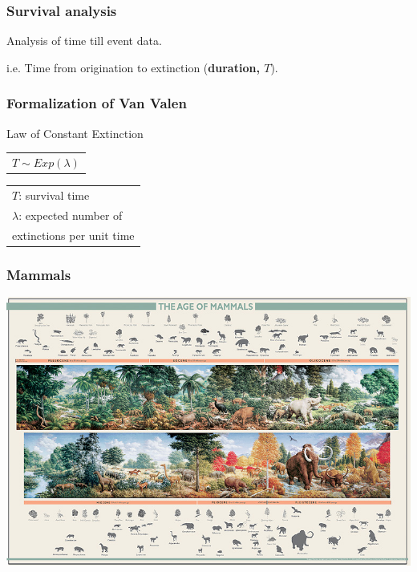 \documentclass{beamer}
\begin{document}
\begin{frame}
  \frametitle{Survival analysis}

  \begin{definition}
    Analysis of \alert{time till event data}.

    i.e. Time from origination to extinction (\textbf{duration, \(T\)}).
  \end{definition}

\end{frame}

\begin{frame}
  \frametitle{Formalization of Van Valen}

  \begin{block}{Law of Constant Extinction}
    \begin{center}
      \begin{tabular}{@{}l@{}}\(T \sim Exp(\lambda)\)\end{tabular}
      \hspace{1.5cm}
      \begin{tabular}{@{}l@{}}\(T\): survival time\\\(\lambda\): expected number of \\extinctions per unit time\end{tabular}
    \end{center}
  \end{block}
\end{frame}

\begin{frame}
  \frametitle{Mammals}
  \includegraphics[height = 0.9\textheight, width = \textwidth, keepaspectratio = true]{figure/aom}

  \tiny{}
\end{frame}
\end{document}

